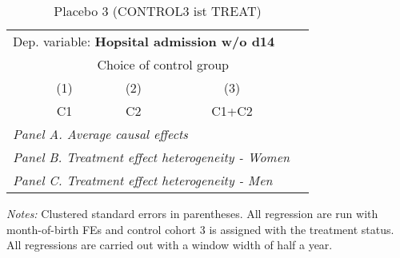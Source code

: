  \begin{table}[H] \centering \begin{threeparttable} \caption{Placebo 3 (CONTROL3 ist TREAT) } {\def\sym#1{\ifmmode^{#1}\else\(^{#1}\)\fi} \begin{tabular}{l*{4}{c}} \toprule \multicolumn{4}{l}{Dep. variable: \textbf{Hopsital admission w/o d14}} \\ & \multicolumn{3}{c}{Choice of control group} \\ \cmidrule(lr){2-4}
            &\multicolumn{1}{c}{(1)}&\multicolumn{1}{c}{(2)}&\multicolumn{1}{c}{(3)}\\
            &\multicolumn{1}{c}{C1}&\multicolumn{1}{c}{C2}&\multicolumn{1}{c}{C1+C2}\\
\midrule
 \multicolumn{4}{l}{\emph{Panel A. Average causal effects}} \\      \midrule\multicolumn{4}{l}{\emph{Panel B. Treatment effect heterogeneity - Women}} \\      \midrule\multicolumn{4}{l}{\emph{Panel C. Treatment effect heterogeneity - Men}} \\      
\bottomrule \end{tabular} } \begin{tablenotes} \item \scriptsize \emph{Notes:} Clustered standard errors in parentheses. All regression are run with month-of-birth FEs and control cohort 3 is assigned with the treatment status. All regressions are carried out with a window width of half a year. \end{tablenotes} \end{threeparttable} \end{table} 
